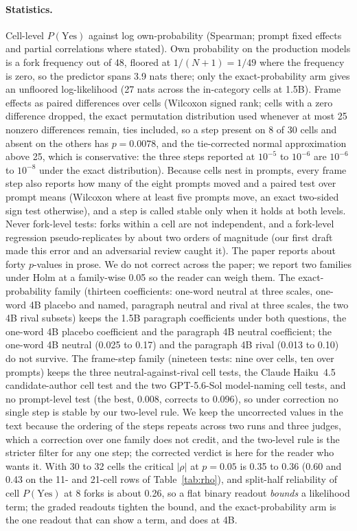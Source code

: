 \documentclass[twocolumn,10pt]{article}
\newcommand{\pyes}{P(\mathrm{Yes})}
\newcommand{\haiku}{Claude Haiku~4.5}
\newcommand{\gpt}{GPT-5.6-Sol}
\begin{document}
\paragraph{Statistics.} Cell-level $\pyes$ against log own-probability (Spearman; prompt fixed effects and partial correlations where stated). Own probability on the production models is a fork frequency out of 48, floored at $1/(N+1) = 1/49$ where the frequency is zero, so the predictor spans 3.9 nats there; only the exact-probability arm gives an unfloored log-likelihood (27 nats across the in-category cells at 1.5B). Frame effects as paired differences over cells (Wilcoxon signed rank; cells with a zero difference dropped, the exact permutation distribution used whenever at most 25 nonzero differences remain, ties included, so a step present on 8 of 30 cells and absent on the others has $p = 0.0078$, and the tie-corrected normal approximation above 25, which is conservative: the three steps reported at $10^{-5}$ to $10^{-6}$ are $10^{-6}$ to $10^{-8}$ under the exact distribution). Because cells nest in prompts, every frame step also reports how many of the eight prompts moved and a paired test over prompt means (Wilcoxon where at least five prompts move, an exact two-sided sign test otherwise), and a step is called stable only when it holds at both levels. Never fork-level tests: forks within a cell are not independent, and a fork-level regression pseudo-replicates by about two orders of magnitude (our first draft made this error and an adversarial review caught it). The paper reports about forty $p$-values in prose. We do not correct across the paper; we report two families under Holm at a family-wise 0.05 so the reader can weigh them. The exact-probability family (thirteen coefficients: one-word neutral at three scales, one-word 4B placebo and named, paragraph neutral and rival at three scales, the two 4B rival subsets) keeps the 1.5B paragraph coefficients under both questions, the one-word 4B placebo coefficient and the paragraph 4B neutral coefficient; the one-word 4B neutral (0.025 to 0.17) and the paragraph 4B rival (0.013 to 0.10) do not survive. The frame-step family (nineteen tests: nine over cells, ten over prompts) keeps the three neutral-against-rival cell tests, the \haiku{} candidate-author cell test and the two \gpt{} model-naming cell tests, and no prompt-level test (the best, 0.008, corrects to 0.096), so under correction no single step is stable by our two-level rule. We keep the uncorrected values in the text because the ordering of the steps repeats across two runs and three judges, which a correction over one family does not credit, and the two-level rule is the stricter filter for any one step; the corrected verdict is here for the reader who wants it. With 30 to 32 cells the critical $|\rho|$ at $p=0.05$ is 0.35 to 0.36 (0.60 and 0.43 on the 11- and 21-cell rows of Table~\ref{tab:rho}), and split-half reliability of cell $\pyes$ at 8 forks is about 0.26, so a flat binary readout \emph{bounds} a likelihood term; the graded readouts tighten the bound, and the exact-probability arm is the one readout that can show a term, and does at 4B.
\end{document}
